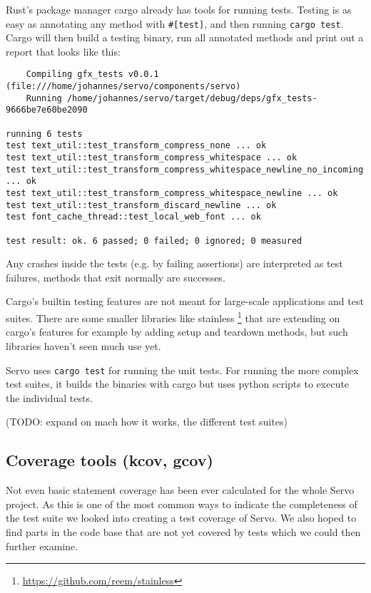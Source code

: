 \documentclass{scrartcl}
\newcommand{\todo}[1] {{\color{red}(TODO: #1)}}
\begin{document}
Rust's package manager cargo already has tools for running tests. Testing is as easy as annotating any method with \texttt{\#[test]}, and then running \texttt{cargo test}. Cargo will then build a testing binary, run all annotated methods and print out a report that looks like this:


\begin{verbatim}
    Compiling gfx_tests v0.0.1 (file:///home/johannes/servo/components/servo)
    Running /home/johannes/servo/target/debug/deps/gfx_tests-9666be7e60be2090

running 6 tests
test text_util::test_transform_compress_none ... ok
test text_util::test_transform_compress_whitespace ... ok
test text_util::test_transform_compress_whitespace_newline_no_incoming ... ok
test text_util::test_transform_compress_whitespace_newline ... ok
test text_util::test_transform_discard_newline ... ok
test font_cache_thread::test_local_web_font ... ok

test result: ok. 6 passed; 0 failed; 0 ignored; 0 measured

\end{verbatim}

Any crashes inside the tests (e.g. by failing assertions) are interpreted as test failures, methods that exit normally are successes.

Cargo's builtin testing features are not meant for large-scale applications and test suites. There are some smaller libraries like stainless \footnote{\url{https://github.com/reem/stainless}} that are extending on cargo's features for example by adding setup and teardown methods, but such libraries haven't seen much use yet. 

Servo uses \texttt{cargo test} for running the unit tests. For running the more complex test suites, it builds the binaries with cargo but uses python scripts to execute the individual tests.

\todo{expand on mach how it works, the different test suites}


\subsection{Coverage tools (kcov, gcov)}
Not even basic statement coverage has been ever calculated for the whole Servo project. As this is one of the most common ways to indicate the completeness of the test suite we looked into creating a test coverage of Servo. We also hoped to find parts in the code base that are not yet covered by tests which we could then further examine. 
\end{document}
